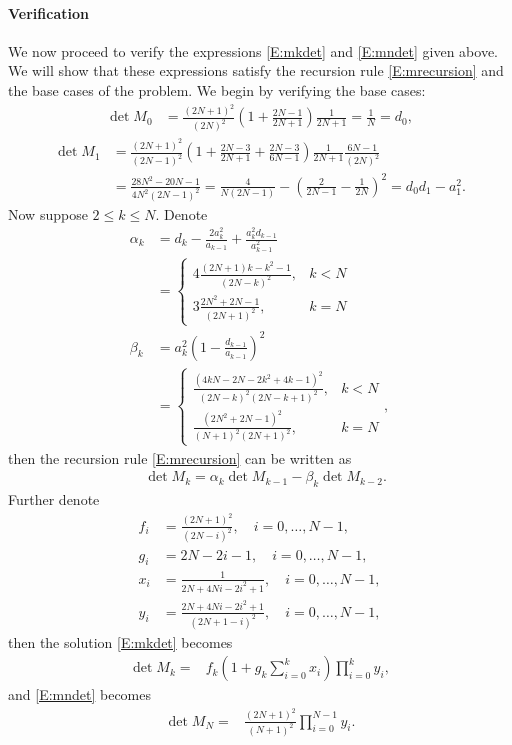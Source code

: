 \documentclass[12pt]{article}
\numberwithin{equation}{section}
\theoremstyle{definition}
\theoremstyle{remark}
\begin{document}
\paragraph{Verification}
We now proceed to verify the expressions \eqref{E:mkdet} and \eqref{E:mndet} given above. We will show that these expressions satisfy the recursion rule \eqref{E:mrecursion}
and the base cases of the problem. We begin by verifying the base cases:
\begin{align*}
    \det M_0 & = \frac{(2N+1)^2}{(2N)^2}\left( 1 +\frac{2N-1}{2N+1}\right) \frac{1}{2N+1}= \frac{1}{N} = d_0,
\end{align*}
\begin{align*}
    \det M_1 & = \frac{(2N+1)^2}{(2N-1)^2} \left( 1 +\frac{2N-3}{2N+1}+ \frac{2N-3}{6N -1}\right) \frac{1}{2N+1} \frac{6N-1}{(2N)^2}  \\
        &= \frac{28N^2-20N-1}{4N^2(2N-1)^2} = \frac{4}{N(2N-1)}-\left(\frac{2}{2N-1}-\frac{1}{2N}\right)^2= d_0 d_1-a_1^2.
\end{align*}
Now suppose $2 \leq k\leq N$. Denote
\begin{align*}
    \alpha_k
            &= d_k-\frac{2 a_k^2}{a_{k-1}}+\frac{a_k^2 d_{k-1}}{a_{k-1}^2} \\
            &=\begin{cases}
                4\frac{(2N+1)k-k^2-1}{(2N-k)^2},            &k<N\\
                3\frac{2N^2+2N-1}{(2N+1)^2},    &k=N
            \end{cases} \\
    \beta_k &= a_k^2\left(1-\frac{d_{k-1}}{a_{k-1}}\right)^2 \\
                &=\begin{cases}
                    \frac{(4 kN-2N-2k^2+4k-1)^2}{(2N-k)^2(2N-k+1)^2}, &k<N\\
                    \frac{(2N^2+2N-1)^2}{(N+1)^2(2N+1)^2}, &k=N
                \end{cases},
\end{align*}
then the recursion rule \eqref{E:mrecursion} can be written as
\begin{align*}
    & \det M_k= \alpha_k \det M_{k-1} - \beta_k \det M_{k-2}.
\end{align*}
Further denote
\begin{align*}
    f_i &= \frac{(2N+1)^2}{(2N-i)^2}, \quad i=0,\dots,N-1, \\
    g_i &= 2N-2i-1, \quad i=0,\dots,N-1,\\
    x_i &= \frac{1}{2N+4 N i - 2 i^2+1}, \quad i=0,\dots,N-1, \\
    y_i &= \frac{2N+4Ni-2i^2+1}{(2N+1-i)^2}, \quad i=0,\dots,N-1,
\end{align*}
then the solution \eqref{E:mkdet} becomes
\begin{align*}
    \det M_k =& f_k \left(1+g_k \sum_{i=0}^{k} x_i\right) \prod_{i=0}^{k} y_i,
\end{align*}
and \eqref{E:mndet} becomes
\begin{align*}
    \det M_N =& \frac{(2N+1)^2}{(N+1)^2} \prod_{i=0}^{N-1} y_i.
\end{align*}
\end{document}
